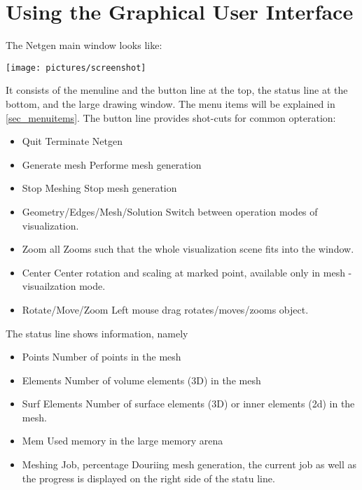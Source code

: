 \documentclass[12pt]{book}
\begin{document}
\chapter{Using the Graphical User Interface}
The Netgen main window looks like:
\begin{center}
\texttt{[image: pictures/screenshot]}
\end{center}
It consists of the menuline and the button line at the top, the status line at
the bottom, and the large drawing window. The menu items will be explained in 
\ref{sec_menuitems}. The button line provides shot-cuts for common opteration:
\begin{itemize}
\item Quit \newline
Terminate Netgen
\item Generate mesh \newline
Performe mesh generation 
\item Stop Meshing \newline
Stop mesh generation 
\item Geometry/Edges/Mesh/Solution \newline
Switch between operation modes of visualization.
\item Zoom all \newline
Zooms such that the whole visualization scene fits into the window.
\item Center \newline
Center rotation and scaling at marked point, available only in mesh - visuailzation mode.
\item Rotate/Move/Zoom
Left mouse drag rotates/moves/zooms object.
\end{itemize}

The status line shows information, namely
\begin{itemize}
\item Points \newline
Number of points in the mesh
\item Elements \newline
Number of volume elements (3D) in the mesh
\item Surf Elements \newline
Number of surface elements (3D) or inner elements (2d) in the mesh.
\item Mem \newline
Used memory in the large memory arena
\item Meshing Job, percentage
Douriing mesh generation, the current job as well as the progress is displayed on the 
right side of the statu line.
\end{itemize}
\end{document}
